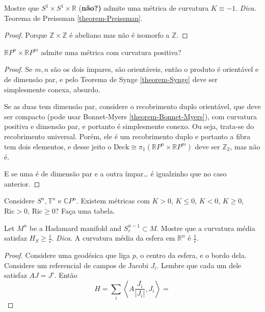 \begin{exercise}
\label{exercise-S1xS1xR-admite-curvatura--1}
Mostre que $S^1 \times S^1 \times \mathbb{R}$
{(\bf não?)} admite uma métrica de
 curvatura $K\equiv-1$. {\it Dica.} Teorema
 de Preissman
\ref{theorem-Preissman}.
\end{exercise}

\begin{proof}
Porque $\mathbb{Z} \times \mathbb{Z}$ é
abeliano mas não é isomorfo a
$\mathbb{Z}$.
\end{proof}

\begin{exercise}
\label{exercise-rpnxr-admit-curva-posit}
$\mathbb{R}P^{n}\times \mathbb{R}P^{m}$
admite uma métrica com
curvatura positiva?
\end{exercise}

\begin{proof}
Se $m,n$ são os dois ímpares, são
orientáveis, então o produto é orientável e
de
dimensão par, e pelo Teorema de Synge
\ref{theorem-Synge} deve ser
simplesmente conexa, absurdo.

Se as duas tem dimensão par, considere o
recobrimento duplo orientável, que deve
ser compacto (pode usar Bonnet-Myers
\ref{theorem-Bonnet-Myers}), com curvatura
positiva e dimensão par, e portanto é
simplesmente conexo. Ou seja, trata-se do
recobrimento universal. Porém, ele é um
recobrimento duplo e portanto a fibra
tem dois elementos, e desse jeito o
$\text{Deck}\cong
\pi_{1}(\mathbb{R}P^{n}\times\mathbb{R}P^{m})
$
deve ser $\mathbb{Z}_2$,
mas não é.

E se uma é de dimensão par e a outra ímpar… é
igualzinho que no caso anterior.
\end{proof}

\begin{exercise}
\label{exercise-Sn-Tn-CPn-existem-curvaturas}
Considere $S^n,\mathbb{T}^n$ e
$\mathbb{C}P^{n}$. Existem métricas com
$K>0$, $K
\leq 0$, $K<0$, $K \geq 0$, $\text{Ric}>0$,
$\text{Ric} \geq 0$? Faça uma
tabela.
\end{exercise}

\begin{exercise}
\label{exercise-Hadamard-manifold-sphere}
Let $M^n$ be a Hadamard manifold and
$S^{n-1}_r \subset M$. Mostre que
 a curvatura média satisfaz $H_S\geq
 \frac{1}{r}$. {\it Dica.} A curvatura média
da esfera em $\mathbb{R}^n$ é $\frac{1}{r}$.
\end{exercise}

\begin{proof}
Considere uma geodésica que liga $p$, o
centro da esfera, e o bordo dela.
Considere um referencial de campos de Jacobi
$J_i$. Lembre que cada um dele
satisfaz $A J=J'$. Então
$$
H=\sum_{i}\left\langle{}A
\frac{J_i}{|J_i|},J_i\right\rangle{}=
$$
\end{proof}

